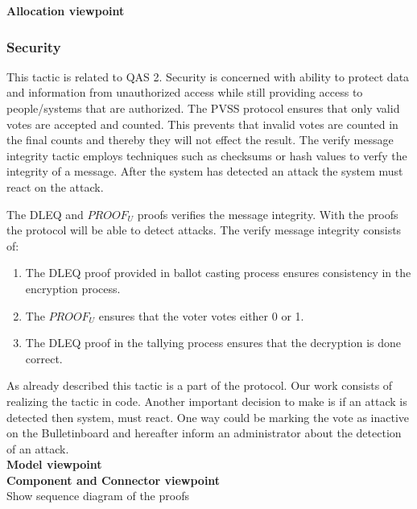 \noindent
\textbf{Allocation viewpoint}\\


\noindent
\subsubsection{Security}
This tactic is related to QAS 2. Security is concerned with ability to protect data and information from unauthorized access while still providing access to people/systems that are authorized. The PVSS protocol ensures that only valid votes are accepted and counted. This prevents that invalid votes are counted in the final counts and thereby they will not effect the result. The verify message integrity tactic employs techniques such as checksums or hash values to verfy the integrity of a message. After the system has detected an attack the system must react on the attack.

\begin{center}
\end{center}
The DLEQ and $PROOF_U$ proofs verifies the message integrity. With the proofs the protocol will be able to detect attacks. The verify message integrity consists of:

\begin{enumerate}
    \item The DLEQ proof provided in ballot casting process ensures consistency in the encryption process.
    \item  The $PROOF_U$ ensures that the voter votes either 0 or 1.
    \item  The DLEQ proof in the tallying process ensures that the decryption is done correct.
\end{enumerate}

\noindent
As already described this tactic is a part of the protocol. Our work consists of realizing the tactic in code. Another important decision to make is if an attack is detected then system, must react. One way could be marking the vote as inactive on the Bulletinboard and hereafter inform an administrator about the detection of an attack.\\   

\noindent
\textbf{Model viewpoint}\\


\noindent
\textbf{Component and Connector viewpoint}\\
Show sequence diagram of the proofs\\

